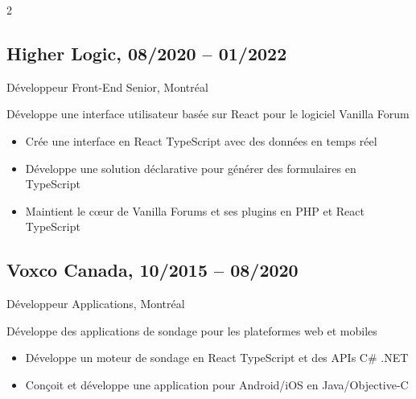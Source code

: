 \documentclass{article}
\begin{document}
\begin{paracol}{2}
\begin{rightcolumn}
    \vspace{1em}

    \subsection{Higher Logic, 08/2020 -- 01/2022}  
    {Développeur Front-End Senior, Montréal\par}  
    {  
      Développe une interface utilisateur basée sur React pour le logiciel Vanilla Forum
    \par}  
    \begin{itemize}  
      \item Crée une interface en React TypeScript avec des données en temps réel  
      \item Développe une solution déclarative pour générer des formulaires en TypeScript  
      \item Maintient le cœur de Vanilla Forums et ses plugins en PHP et React TypeScript  
    \end{itemize}  

    \vspace{1em}  

    \subsection{Voxco Canada, 10/2015 -- 08/2020}  
    {Développeur Applications, Montréal\par}  
    {  
      Développe des applications de sondage pour les plateformes web et mobiles  
    \par}  
    \begin{itemize}  
      \item Développe un moteur de sondage en React TypeScript et des APIs C\# .NET
      \item Conçoit et développe une application pour Android/iOS en Java/Objective-C  
    \end{itemize}  

    \vspace{1em}  


\end{rightcolumn}
\end{paracol}
\end{document}
